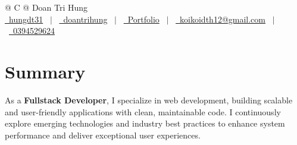 \documentclass[a4paper,12pt]{article}
\begin{document}
\pagestyle{fancy} 



\begin{tabularx}{\linewidth}{@{} C @{}}
\Huge{Doan Tri Hung} \\[7.5pt]
\href{https://github.com/hungdt31}{\raisebox{-0.05\height}\faGithub\ hungdt31} \ $|$ \ 
\href{https://www.linkedin.com/in/hungdt31}{\raisebox{-0.05\height}\faLinkedin\ doantrihung} \ $|$ \ 
\href{https://dthretro-portfolio.vercel.app}{\raisebox{-0.05\height}\faGlobe \ Portfolio} \ $|$ \ 
\href{mailto:koikoidth12@gmail.com}{\raisebox{-0.05\height}\faEnvelope \ koikoidth12@gmail.com} \ $|$ \ 
\href{tel:0394529624}{\raisebox{-0.05\height}\faMobile \ 0394529624} \\
\end{tabularx}


\section{Summary}
As a \textbf{Fullstack Developer}, I specialize in web development, building scalable and user-friendly applications with clean, maintainable code. I continuously explore emerging technologies and industry best practices to enhance system performance and deliver exceptional user experiences.

\end{document}
